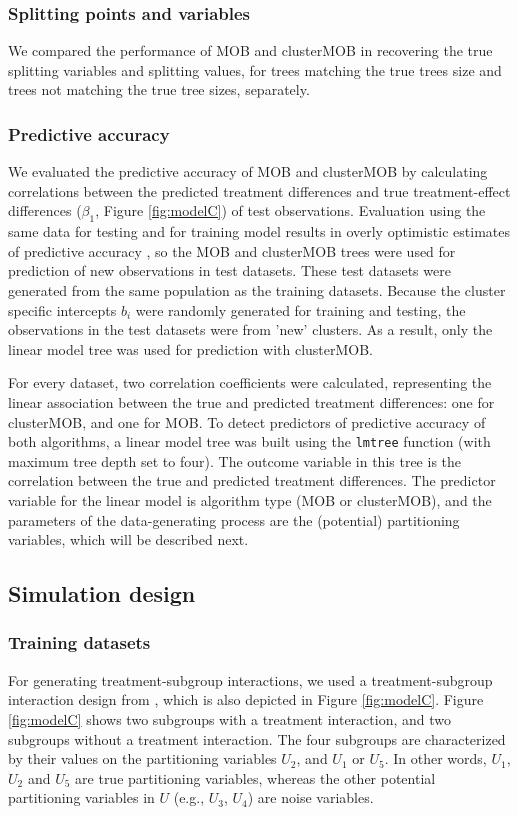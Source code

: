 \documentclass[nobf,man]{apa}
\begin{document}
\subsubsection{Splitting points and variables} 

We compared the performance of MOB and clusterMOB in recovering the true splitting variables and splitting values, for trees matching the true trees size and trees not matching the true tree sizes, separately.

\subsubsection{Predictive accuracy} 

We evaluated the predictive accuracy of MOB and clusterMOB by calculating correlations between the predicted treatment differences and true treatment-effect differences ($\beta_1$, Figure \ref{fig:modelC}) of test observations. Evaluation using the same data for testing and for training model results in overly optimistic estimates of predictive accuracy \cite{HastyTibs09}, so the MOB and clusterMOB trees were used for prediction of new observations in test datasets. These test datasets were generated from the same population as the training datasets. Because the cluster specific intercepts $b_i$ were randomly generated for training and testing, the observations in the test datasets were from 'new' clusters. As a result, only the linear model tree was used for prediction with clusterMOB.

For every dataset, two correlation coefficients were calculated, representing the linear association between the true and predicted treatment differences: one for clusterMOB, and one for MOB. To detect predictors of predictive accuracy of both algorithms, a linear model tree was built using the \verb|lmtree| function (with maximum tree depth set to four). The outcome variable in this tree is the correlation between the true and predicted treatment differences. The predictor variable for the linear model is algorithm type (MOB or clusterMOB), and the parameters of the data-generating process are the (potential) partitioning variables, which will be described next.


\subsection{Simulation design}

\subsubsection{Training datasets}
For generating treatment-subgroup interactions, we used a treatment-subgroup interaction design from , which is also depicted in Figure \ref{fig:modelC}. Figure \ref{fig:modelC} shows two subgroups with a treatment interaction, and two subgroups without a treatment interaction. The four subgroups are characterized by their values on the partitioning variables $U_2$, and $U_1$ or $U_5$. In other words, $U_1$, $U_2$ and $U_5$ are true partitioning variables, whereas the other potential partitioning variables in $U$ (e.g., $U_3$, $U_4$) are noise variables.
\end{document}
